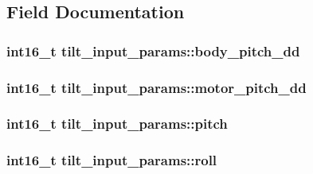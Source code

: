 \subsection{Field Documentation}
\hypertarget{structtilt__input__params_aa39098c64be261c839d5e77d87b14a60}{
\subsubsection[{body\+\_\+pitch\+\_\+dd}]{\setlength{\rightskip}{0pt plus 5cm}int16\+\_\+t tilt\+\_\+input\+\_\+params\+::body\+\_\+pitch\+\_\+dd}}\label{structtilt__input__params_aa39098c64be261c839d5e77d87b14a60}
\hypertarget{structtilt__input__params_a11386ba868291c551805055e98d245c7}{
\subsubsection[{motor\+\_\+pitch\+\_\+dd}]{\setlength{\rightskip}{0pt plus 5cm}int16\+\_\+t tilt\+\_\+input\+\_\+params\+::motor\+\_\+pitch\+\_\+dd}}\label{structtilt__input__params_a11386ba868291c551805055e98d245c7}
\hypertarget{structtilt__input__params_a127abbf9c4e9ba2ec7e570622ddd57a4}{
\subsubsection[{pitch}]{\setlength{\rightskip}{0pt plus 5cm}int16\+\_\+t tilt\+\_\+input\+\_\+params\+::pitch}}\label{structtilt__input__params_a127abbf9c4e9ba2ec7e570622ddd57a4}
\hypertarget{structtilt__input__params_a745f9d362a546b08eaba4a68debafc42}{
\subsubsection[{roll}]{\setlength{\rightskip}{0pt plus 5cm}int16\+\_\+t tilt\+\_\+input\+\_\+params\+::roll}}\label{structtilt__input__params_a745f9d362a546b08eaba4a68debafc42}
